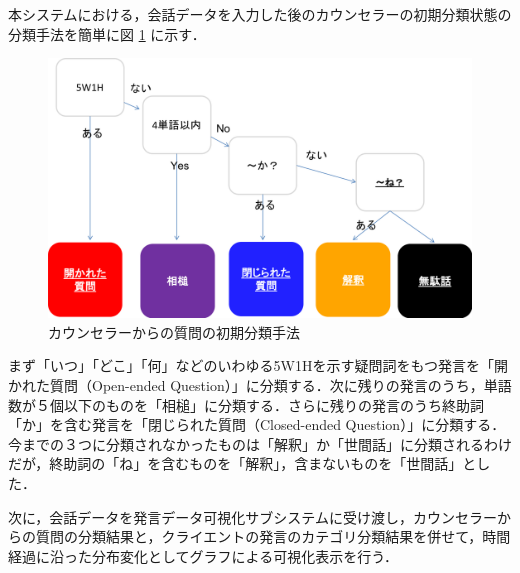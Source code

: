 \documentclass[shuuron]{kuee}
\begin{document}
本システムにおける，会話データを入力した後のカウンセラーの初期分類状態の分類手法を簡単に図
\ref{fig:5_2}
に示す．
\begin{figure}
  \begin{center}
    \includegraphics[width=\linewidth]{5_2.png}
  \end{center}
  \caption{カウンセラーからの質問の初期分類手法}
  \label{fig:5_2}
\end{figure}
まず「いつ」「どこ」「何」などのいわゆる5W1Hを示す疑問詞をもつ発言を「開かれた質問（Open-ended Question）」に分類する．次に残りの発言のうち，単語数が５個以下のものを「相槌」に分類する．さらに残りの発言のうち終助詞「か」を含む発言を「閉じられた質問（Closed-ended Question）」に分類する．今までの３つに分類されなかったものは「解釈」か「世間話」に分類されるわけだが，終助詞の「ね」を含むものを「解釈」，含まないものを「世間話」とした．



次に，会話データを発言データ可視化サブシステムに受け渡し，カウンセラーからの質問の分類結果と，クライエントの発言のカテゴリ分類結果を併せて，時間経過に沿った分布変化としてグラフによる可視化表示を行う．










\end{document}
